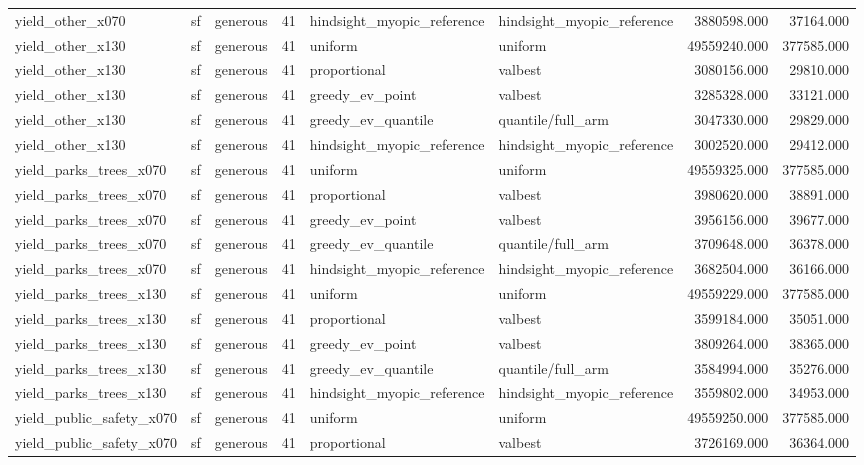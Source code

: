 \begin{tabular}{lllrllrr}
yield\_other\_x070 & sf & generous & 41 & hindsight\_myopic\_reference & hindsight\_myopic\_reference & 3880598.000 & 37164.000 \\
yield\_other\_x130 & sf & generous & 41 & uniform & uniform & 49559240.000 & 377585.000 \\
yield\_other\_x130 & sf & generous & 41 & proportional & valbest & 3080156.000 & 29810.000 \\
yield\_other\_x130 & sf & generous & 41 & greedy\_ev\_point & valbest & 3285328.000 & 33121.000 \\
yield\_other\_x130 & sf & generous & 41 & greedy\_ev\_quantile & quantile/full\_arm & 3047330.000 & 29829.000 \\
yield\_other\_x130 & sf & generous & 41 & hindsight\_myopic\_reference & hindsight\_myopic\_reference & 3002520.000 & 29412.000 \\
yield\_parks\_trees\_x070 & sf & generous & 41 & uniform & uniform & 49559325.000 & 377585.000 \\
yield\_parks\_trees\_x070 & sf & generous & 41 & proportional & valbest & 3980620.000 & 38891.000 \\
yield\_parks\_trees\_x070 & sf & generous & 41 & greedy\_ev\_point & valbest & 3956156.000 & 39677.000 \\
yield\_parks\_trees\_x070 & sf & generous & 41 & greedy\_ev\_quantile & quantile/full\_arm & 3709648.000 & 36378.000 \\
yield\_parks\_trees\_x070 & sf & generous & 41 & hindsight\_myopic\_reference & hindsight\_myopic\_reference & 3682504.000 & 36166.000 \\
yield\_parks\_trees\_x130 & sf & generous & 41 & uniform & uniform & 49559229.000 & 377585.000 \\
yield\_parks\_trees\_x130 & sf & generous & 41 & proportional & valbest & 3599184.000 & 35051.000 \\
yield\_parks\_trees\_x130 & sf & generous & 41 & greedy\_ev\_point & valbest & 3809264.000 & 38365.000 \\
yield\_parks\_trees\_x130 & sf & generous & 41 & greedy\_ev\_quantile & quantile/full\_arm & 3584994.000 & 35276.000 \\
yield\_parks\_trees\_x130 & sf & generous & 41 & hindsight\_myopic\_reference & hindsight\_myopic\_reference & 3559802.000 & 34953.000 \\
yield\_public\_safety\_x070 & sf & generous & 41 & uniform & uniform & 49559250.000 & 377585.000 \\
yield\_public\_safety\_x070 & sf & generous & 41 & proportional & valbest & 3726169.000 & 36364.000 \\

\end{tabular}
